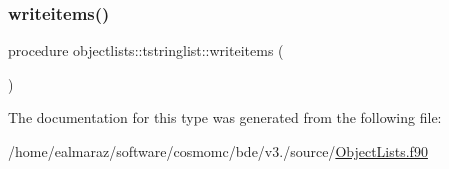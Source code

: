 \mbox{\label{structobjectlists_1_1tstringlist_aac7a4ed96ee23bc9227586f53817d404}} 
\subsubsection{\texorpdfstring{writeitems()}{writeitems()}}
{\footnotesize\ttfamily procedure objectlists\+::tstringlist\+::writeitems (\begin{DoxyParamCaption}{ }\end{DoxyParamCaption})\hspace{0.3cm}{\ttfamily [private]}}



The documentation for this type was generated from the following file\+:\begin{DoxyCompactItemize}
\item 
/home/ealmaraz/software/cosmomc/bde/v3./source/\mbox{\hyperlink{ObjectLists_8f90}{Object\+Lists.\+f90}}\end{DoxyCompactItemize}
